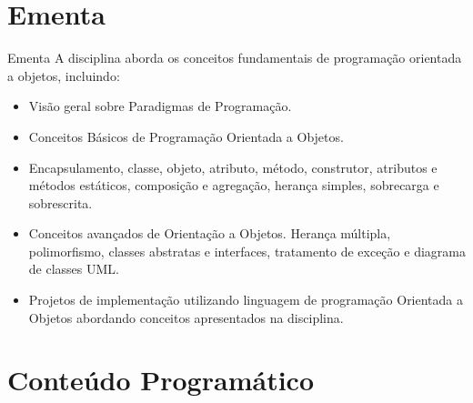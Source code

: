 \documentclass[aspectratio=169]{beamer}
\begin{document}
\section{Ementa}

\begin{frame}{Ementa}
A disciplina aborda os conceitos fundamentais de programação orientada a objetos, incluindo:
\begin{itemize}
    \item Visão geral sobre Paradigmas de Programação. 
    \item Conceitos Básicos de Programação Orientada a Objetos. 
    \item Encapsulamento, classe, objeto, atributo, método, construtor, atributos e métodos estáticos, composição e agregação, herança simples, sobrecarga e sobrescrita. 
    \item Conceitos avançados de Orientação a Objetos. Herança múltipla, polimorfismo, classes abstratas e interfaces, tratamento de exceção e diagrama de classes UML. 
    \item Projetos de implementação utilizando linguagem de programação Orientada a Objetos abordando conceitos apresentados na disciplina.
\end{itemize}
\end{frame}

\section{Conteúdo Programático}
\end{document}
